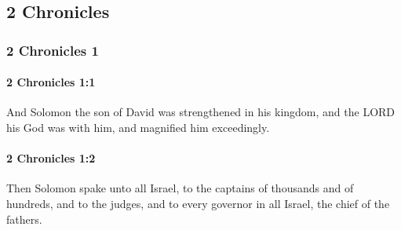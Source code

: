 \subsection{2 Chronicles}
	\label{2CHRONICLES}

	\subsubsection{2 Chronicles 1} %
		\label{2CHRONICLES-1}

		\paragraph{2 Chronicles 1:1} %
			\label{2CHRONICLES-1-1}

			And Solomon the son of David was strengthened in his kingdom, and the LORD his God was with him, and magnified him exceedingly.


		\paragraph{2 Chronicles 1:2} %
			\label{2CHRONICLES-1-2}

			Then Solomon spake unto all Israel, to the captains of thousands and of hundreds, and to the judges, and to every governor in all Israel, the chief of the fathers.

